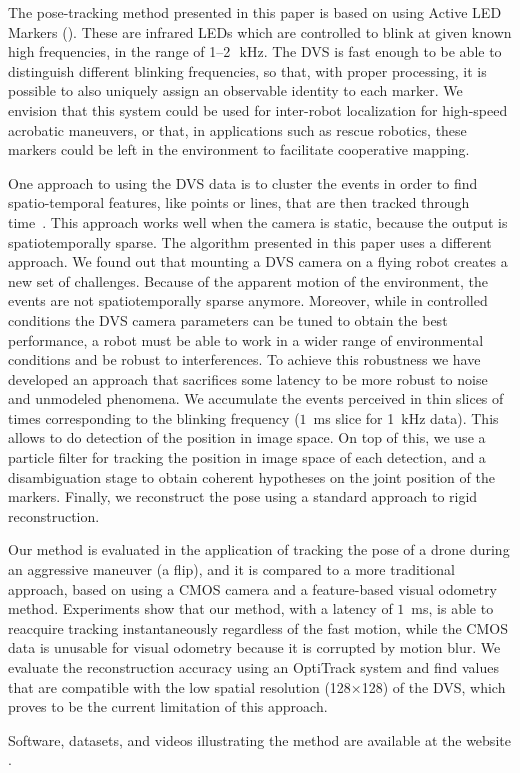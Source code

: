 The pose-tracking method presented in this paper is based on using
Active LED Markers (\ALMs). These are infrared LEDs which are controlled
to blink at given known high frequencies, in the range of 1--2~$\,\mbox{kHz}$.
The DVS is fast enough to be able to distinguish different blinking
frequencies, so that, with proper processing, it is possible to also
uniquely assign an observable identity to each marker. We envision
that this system could be used for inter-robot localization for high-speed
acrobatic maneuvers, or that, in applications such as rescue robotics,
these markers could be left in the environment to facilitate cooperative
mapping.

One approach to using the DVS data is to cluster the events in order
to find spatio-temporal features, like points or lines, that are then
tracked through time~\cite{delbruck07fast,conradt09pencil,Matthias}.
This approach works well when the camera is static, because the output
is spatiotemporally sparse. The algorithm presented in this paper
uses a different approach. We found out that mounting a DVS camera
on a flying robot creates a new set of challenges. Because of the
apparent motion of the environment, the events are not spatiotemporally
sparse anymore. Moreover, while in controlled conditions the DVS camera
parameters can be tuned to obtain the best performance, a robot must
be able to work in a wider range of environmental conditions and be
robust to interferences. To achieve this robustness we have developed
an approach that sacrifices some latency to be more robust to noise
and unmodeled phenomena. We accumulate the events perceived in thin
slices of times corresponding to the blinking frequency ($1$~ms
slice for 1~kHz data). This allows to do detection of the \ALMs
position in image space. On top of this, we use a particle filter
for tracking the position in image space of each detection, and a
disambiguation stage to obtain coherent hypotheses on the joint position
of the markers. Finally, we reconstruct the pose using a standard
approach to rigid reconstruction.

Our method is evaluated in the application of tracking the pose of
a drone during an aggressive maneuver (a flip), and it is compared
to a more traditional approach, based on using a CMOS camera and a
feature-based visual odometry method. Experiments show that our method,
with a latency of $1$~ms, is able to reacquire tracking instantaneously
regardless of the fast motion, while the CMOS data is unusable for
visual odometry because it is corrupted by motion blur. We evaluate
the reconstruction accuracy using an OptiTrack system and find values
that are compatible with the low spatial resolution (128$\times$128)
of the DVS, which proves to be the current limitation of this approach.



Software, datasets, and videos illustrating the method are available
at the website \myurl.

